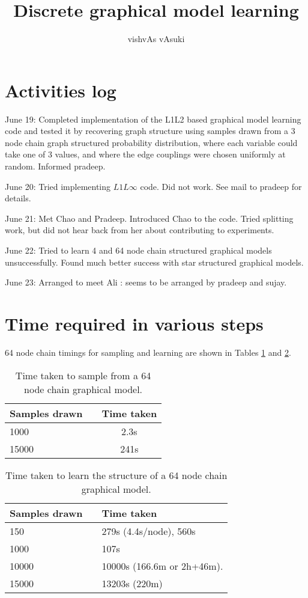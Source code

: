 \documentclass[oneside, article]{memoir}
\title{Discrete graphical model learning}
\author{vishvAs vAsuki}
\begin{document}
\maketitle
\tableofcontents

\section{Activities log}
June 19: Completed implementation of the L1L2 based graphical model learning code and tested it by recovering graph structure using samples drawn from a 3 node chain graph structured probability distribution, where each variable could take one of 3 values, and where the edge couplings were chosen uniformly at random. Informed pradeep.

June 20: Tried implementing $L1L\infty$ code. Did not work. See mail to pradeep for details.

June 21: Met Chao and Pradeep. Introduced Chao to the code. Tried splitting work, but did not hear back from her about contributing to experiments.

June 22: Tried to learn 4 and 64 node chain structured graphical models unsuccessfully. Found much better success with star structured graphical models.

June 23: Arranged to meet Ali : seems to be arranged by pradeep and sujay.

\section{Time required in various steps}
64 node chain timings for sampling and learning are shown in Tables \ref{tab:timingSampling} and \ref{tab:timingStructureLearning}.

\begin{table}[h]
\begin{tabular}{| p{7 cm} | c | c |} \hline
Samples drawn& & Time taken\\ \hline\hline
1000& & 2.3s\\ \hline\hline
15000& & 241s\\ \hline\hline
\end{tabular}
\caption{Time taken to sample from a 64 node chain graphical model.}
\label{tab:timingSampling}
\end{table}

\begin{table}[h]
\begin{tabular}{| p{2 cm} | c | p{2 cm} | |} \hline
Samples drawn& & Time taken\\ \hline\hline
150& & 279s (4.4s/node), 560s\\ \hline
1000& & 107s\\ \hline
10000& & 10000s (166.6m or 2h+46m).\\ \hline\hline
15000& & 13203s (220m)\\ \hline
\end{tabular}
\caption{Time taken to learn the structure of a 64 node chain graphical model.}
\label{tab:timingStructureLearning}
\end{table}
\end{document}
